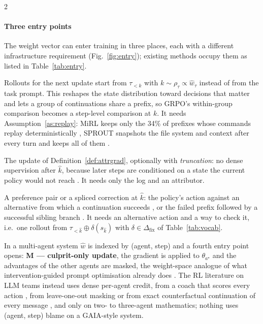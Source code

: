 \begin{multicols}{2}
\paragraph{Three entry points} The weight vector can enter training in three places, each with a different infrastructure requirement (Fig.~\ref{fig:entry}); existing methods occupy them as listed in Table~\ref{tab:entry}.
\begin{description}[leftmargin=1.4em,style=nextline,itemsep=1pt]
\item[R --- Restart.] Rollouts for the next update start from $\tau_{<k}$ with $k\sim\rho_\tau\propto\hat w_\tau$ instead of from the task prompt. This reshapes the state distribution toward decisions that matter and lets a group of continuations share a prefix, so GRPO's within-group comparison becomes a step-level comparison at $k$. It needs Assumption~\ref{as:replay}: MiRL keeps only the 34\% of prefixes whose commands replay deterministically \cite{tian2026mirl}, SPROUT snapshots the file system and context after every turn and keeps all of them \cite{liu2026sprout}.
\item[C --- Credit.] The update of Definition~\ref{def:attrgrad}, optionally with \emph{truncation}: no dense supervision after $\hat k$, because later steps are conditioned on a state the current policy would not reach \cite{huang2026etro,guo2026pivoarl}. It needs only the log and an attributor.
\item[D --- Data.] A preference pair or a spliced correction at $\hat k$: the policy's action against an alternative from which a continuation succeeds \cite{li2026cso}, or the failed prefix followed by a successful sibling branch \cite{yuan2025agentr}. It needs an alternative action and a way to check it, i.e.\ one rollout from $\tau_{<\hat k}\oplus\delta(s_{\hat k})$ with $\delta\in\Delta_{\mathrm{fix}}$ of Table~\ref{tab:vocab}.
\end{description}
In a multi-agent system $\hat w$ is indexed by (agent, step) and a fourth entry point opens: \textbf{M --- culprit-only update}, the gradient is applied to $\theta_{a^\star}$ and the advantages of the other agents are masked, the weight-space analogue of what intervention-guided prompt optimisation already does \cite{chu2026agentgrad}. The RL literature on LLM teams instead uses dense per-agent credit, from a coach that scores every action \cite{li2026mappa}, from leave-one-out masking \cite{li2026sharp} or from exact counterfactual continuation of every message \cite{chen2026c3}, and only on two- to three-agent mathematics; nothing uses (agent, step) blame on a GAIA-style system.
\end{multicols}

